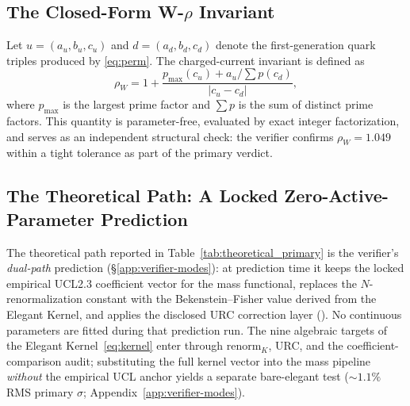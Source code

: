 \documentclass[11pt]{article}
\theoremstyle{remark}
\begin{document}
\subsection{The Closed-Form W-\texorpdfstring{$\rho$}{rho} Invariant}
\label{subsec:wrho}

Let $u = (a_u, b_u, c_u)$ and $d = (a_d, b_d, c_d)$ denote the first-generation quark triples produced by \cref{eq:perm}.
The charged-current invariant is defined as
\begin{equation}
\rho_W = 1 + \frac{p_{\max}(c_u) + a_u / \sum p(c_d)}{|c_u - c_d|},
\label{eq:wrho}
\end{equation}
where $p_{\max}$ is the largest prime factor and $\sum p$ is the sum of distinct prime factors.
This quantity is parameter-free, evaluated by exact integer factorization, and serves as an independent structural check: the verifier confirms $\rho_W = 1.049$ within a tight tolerance as part of the primary verdict.


\subsection{The Theoretical Path: A Locked Zero-Active-Parameter Prediction}
\label{subsec:theoretical}

The theoretical path reported in Table~\ref{tab:theoretical_primary} is the verifier's \emph{dual-path} prediction (\S\ref{app:verifier-modes}): at prediction time it keeps the locked empirical UCL2.3 coefficient vector for the mass functional, replaces the $N$-renormalization constant with the Bekenstein--Fisher value derived from the Elegant Kernel, and applies the disclosed URC correction layer ().
No continuous parameters are fitted during that prediction run.
The nine algebraic targets of the Elegant Kernel~\eqref{eq:kernel} enter through $\mathrm{renorm}_K$, URC, and the coefficient-comparison audit; substituting the full kernel vector into the mass pipeline \emph{without} the empirical UCL anchor yields a separate bare-elegant test ($\sim 1.1\%$ RMS primary $\sigma$; Appendix~\ref{app:verifier-modes}).
\end{document}
